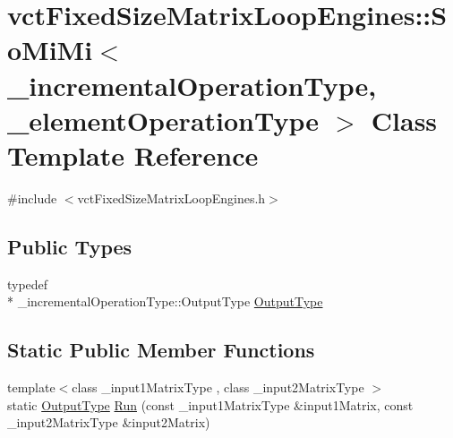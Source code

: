 \hypertarget{classvct_fixed_size_matrix_loop_engines_1_1_so_mi_mi}{\section{vct\-Fixed\-Size\-Matrix\-Loop\-Engines\-:\-:So\-Mi\-Mi$<$ \-\_\-incremental\-Operation\-Type, \-\_\-element\-Operation\-Type $>$ Class Template Reference}
\label{classvct_fixed_size_matrix_loop_engines_1_1_so_mi_mi}
}


{\ttfamily \#include $<$vct\-Fixed\-Size\-Matrix\-Loop\-Engines.\-h$>$}

\subsection*{Public Types}
\begin{DoxyCompactItemize}
\item 
typedef \\*
\-\_\-incremental\-Operation\-Type\-::\-Output\-Type \hyperlink{classvct_fixed_size_matrix_loop_engines_1_1_so_mi_mi_ad85308241e1812e572d025b957d12d06}{Output\-Type}
\end{DoxyCompactItemize}
\subsection*{Static Public Member Functions}
\begin{DoxyCompactItemize}
\item 
{\footnotesize template$<$class \-\_\-input1\-Matrix\-Type , class \-\_\-input2\-Matrix\-Type $>$ }\\static \hyperlink{classvct_fixed_size_matrix_loop_engines_1_1_so_mi_mi_ad85308241e1812e572d025b957d12d06}{Output\-Type} \hyperlink{classvct_fixed_size_matrix_loop_engines_1_1_so_mi_mi_a90354f34be48ee0df4020ca472302307}{Run} (const \-\_\-input1\-Matrix\-Type \&input1\-Matrix, const \-\_\-input2\-Matrix\-Type \&input2\-Matrix)
\end{DoxyCompactItemize}


